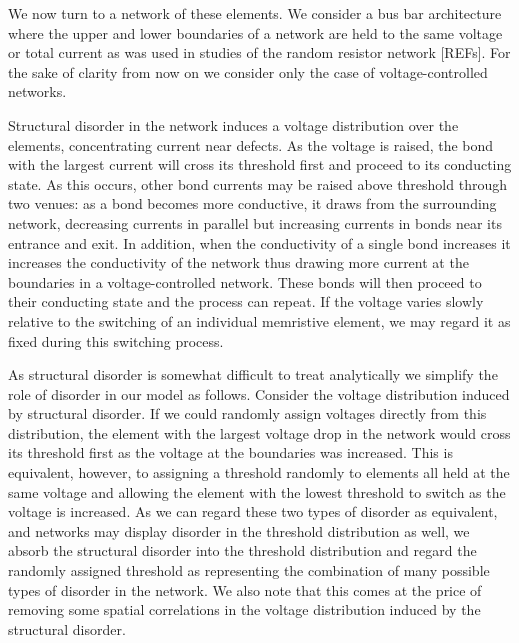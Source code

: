 \documentclass[aps,prl,reprint,groupedaddress]{revtex4-1}
\begin{document}
We now turn to a network of these elements.  We consider a bus bar
architecture
where the upper and lower boundaries of a network are held to the same
voltage or total current as was used in studies of the random resistor
network [REFs]. For the sake of clarity from now on we consider only the
case of voltage-controlled networks. 

Structural disorder in the
network induces a voltage distribution over the elements, concentrating
current near defects. As the voltage is raised, the bond with the largest
current will cross its threshold first and proceed to its conducting state.
As this occurs, other bond currents may be raised above threshold through
two venues: as a bond becomes more conductive, it draws from the surrounding
network, decreasing currents in parallel but increasing currents in bonds near
its entrance and exit. In addition, when the conductivity of a single bond
increases it 
increases the conductivity of the network thus drawing more current at the
boundaries in a voltage-controlled network. These bonds will then proceed to
their conducting state and the process can repeat.  If the voltage varies
slowly relative to the switching of an individual memristive element, we may
regard it as fixed during this switching process.

As structural disorder is somewhat difficult to treat analytically we simplify
the role of disorder in our model as follows.  Consider the voltage
distribution induced by structural disorder.  If we could randomly assign
voltages directly
from this distribution, the element with the largest voltage drop in the
network would cross its threshold first as the voltage at the boundaries was
increased.  This is equivalent, however, to
assigning a threshold randomly to elements all held at the same voltage and
allowing the element with the lowest threshold to switch as the voltage is
increased.  As we can regard these two types of disorder as equivalent, and
networks may display disorder in the threshold distribution as well, we absorb
the structural disorder into the threshold distribution and regard the
randomly assigned threshold as representing the combination of many possible
types of disorder in the network.  We also note that this comes at the price
of removing some spatial correlations in the voltage distribution induced by the
structural disorder.
\end{document}
